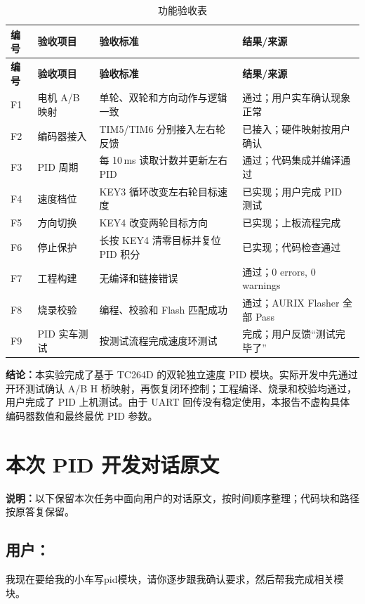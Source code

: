 \documentclass[11pt,a4paper,fontset=fandol]{ctexart}
\begin{document}
\begin{longtable}{p{}p{}p{}p{}}
\caption{功能验收表}\\
\toprule
\textbf{编号} & \textbf{验收项目} & \textbf{验收标准} & \textbf{结果/来源}\\
\midrule
\endfirsthead
\toprule
\textbf{编号} & \textbf{验收项目} & \textbf{验收标准} & \textbf{结果/来源}\\
\midrule
\endhead
F1 & 电机 A/B 映射 & 单轮、双轮和方向动作与逻辑一致 & 通过；用户实车确认现象正常\\
F2 & 编码器接入 & TIM5/TIM6 分别接入左右轮反馈 & 已接入；硬件映射按用户确认\\
F3 & PID 周期 & 每 10\,ms 读取计数并更新左右 PID & 通过；代码集成并编译通过\\
F4 & 速度档位 & KEY3 循环改变左右轮目标速度 & 已实现；用户完成 PID 测试\\
F5 & 方向切换 & KEY4 改变两轮目标方向 & 已实现；上板流程完成\\
F6 & 停止保护 & 长按 KEY4 清零目标并复位 PID 积分 & 已实现；代码检查通过\\
F7 & 工程构建 & 无编译和链接错误 & 通过；0 errors, 0 warnings\\
F8 & 烧录校验 & 编程、校验和 Flash 匹配成功 & 通过；AURIX Flasher 全部 Pass\\
F9 & PID 实车测试 & 按测试流程完成速度环测试 & 完成；用户反馈“测试完毕了”\\
\bottomrule
\end{longtable}

\noindent\textbf{结论：}本实验完成了基于 TC264D 的双轮独立速度 PID 模块。实际开发中先通过开环测试确认 A/B H 桥映射，再恢复闭环控制；工程编译、烧录和校验均通过，用户完成了 PID 上机测试。由于 UART 回传没有稳定使用，本报告不虚构具体编码器数值和最终最优 PID 参数。

\appendix
\section{本次 PID 开发对话原文}

\noindent\textbf{说明：}以下保留本次任务中面向用户的对话原文，按时间顺序整理；代码块和路径按原答复保留。

\subsection*{用户：}
我现在要给我的小车写pid模块，请你逐步跟我确认要求，然后帮我完成相关模块。
\end{document}
